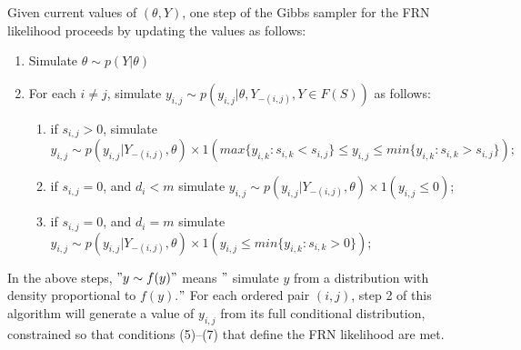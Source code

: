 \documentclass[12pt]{ociamthesis}  %
\begin{document}
	Given current values of $(\theta, Y)$, one step of the Gibbs sampler for the FRN likelihood proceeds by updating the values as follows: \newline
	\begin{enumerate}
	\item Simulate $\theta \sim p(Y|\theta)$
	\item For each $i \neq j$, simulate $y_{i,j} \sim p(y_{i,j}|\theta, Y_{-(i,j)}, Y \in F(S))$ as follows:
	\begin{enumerate}
	
	\item if $s_{i,j} > 0$, simulate \newline
	$y_{i,j} \sim p(y_{i,j}| Y_{-(i,j)},\theta) \times 1(max \{ y_{i,k} : s_{i,k} < s_{i,j} \} \leq y_{i,j} \leq min \{ y_{i,k} : s_{i,k} > s_{i,j} \} ); $
	
	\item if $s_{i,j} = 0$, and $d_{i} < m$ simulate $y_{i,j} \sim p(y_{i,j}| Y_{-(i,j)}, \theta) \times 1(y_{i,j} \leq 0)$;
	
	\item if $s_{i,j} = 0$, and $d_{i} = m$ simulate $y_{i,j} \sim p(y_{i,j}| Y_{-(i,j)}, \theta) \times 1(y_{i,j} \leq min \{ y_{i,k} : s_{i,k} > 0 \})$;
	\end{enumerate}
	\end{enumerate}
	In the above steps, $"y \sim f(y)"$ means $"$ simulate $y$ from a distribution with density proportional
	to $f(y)$.$ " $ For each ordered pair $(i, j)$, step 2 of this algorithm will generate a value of $y_{i,j}$ from its full conditional distribution, constrained so that conditions (5)$ – $(7) that define the FRN likelihood are met.
	
\end{document}
